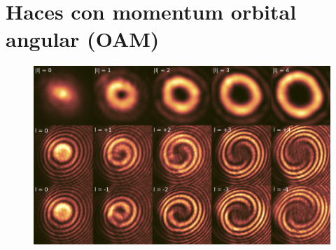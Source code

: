 \chapter{Haces con momentum orbital angular (OAM)}

\begin{figure}[H]
	\includegraphics[width=\linewidth]{media/OAM-free.png}
\end{figure}